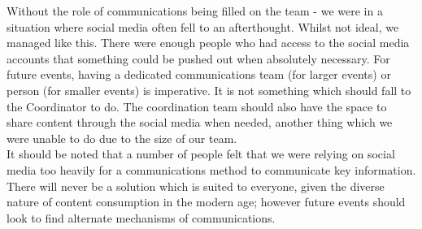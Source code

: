 Without the role of communications being filled on the team - we were in a situation where social media often fell to an afterthought. Whilst not ideal, we managed like this. There were enough people who had access to the social media accounts that something could be pushed out when absolutely necessary. For future events, having a dedicated communications team (for larger events) or person (for smaller events) is imperative. It is not something which should fall to the Coordinator to do. The coordination team should also have the space to share content through the social media when needed, another thing which we were unable to do due to the size of our team.\\

It should be noted that a number of people felt that we were relying on social media too heavily for a communications method to communicate key information. There will never be a solution which is suited to everyone, given the diverse nature of content consumption in the modern age; however future events should look to find alternate mechanisms of communications. 
